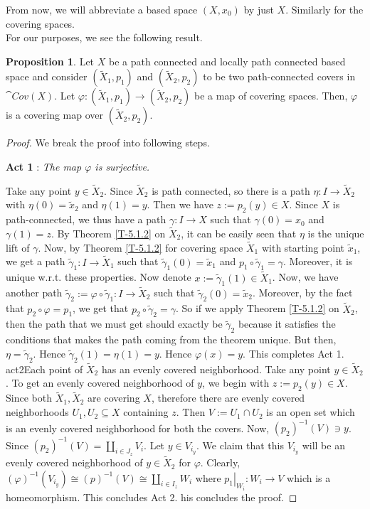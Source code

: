 \documentclass[letterpaper,11pt,twoside]{article}
\theoremstyle{definition}
\newtheorem{proposition}{Proposition}[subsection]
\theoremstyle{definition}
\theoremstyle{definition}
\theoremstyle{definition}
\theoremstyle{definition}
\theoremstyle{definition}
\theoremstyle{remark}
\theoremstyle{definition}
\newenvironment{act}[2]{\begin{center}
		\textbf{Act #1} : \textit{#2}
	\end{center}
}
\newcommand{\cat}[1]{{\fontfamily{lmss}\selectfont 
		\text{\textbf{#1}}
}}
\newcommand{\isom}{\cong}
\newcommand{\rest}[2]{\left. { #1 }\right \vert_{#2}}
\newcommand{\inv}[1]{\left(#1\right)^{-1}}
\newcommand{\Cov}[1]{\cat{Cov}\left (#1\right )}
\begin{document}
From now, we will abbreviate a based space $ (X,x_0) $ by just $ X $. Similarly for the covering spaces.\\

For our purposes, we see the following result.
\begin{proposition}\label{P-6.1.12}
	Let $ X $ be a path connected and locally path connected based space and consider $ (\tilde{X}_1,p_1) $ and $ (\tilde{X}_2,p_2) $ to be two path-connected covers in $ \Cov{X} $. Let $ \varphi: (\tilde{X}_1,p_1) \to (\tilde{X}_2,p_2) $ be a map of covering spaces. Then, $ \varphi $ is a covering map over $ (\tilde{X}_2,p_2) $. 
\end{proposition}
\begin{proof}We break the proof into following steps.
	\begin{act}{1}{The map $ \varphi $ is surjective.}
		Take any point $ y\in \tilde{X}_2 $. Since $ \tilde{X}_2 $ is path connected, so there is a path $ \eta : I \to \tilde{X}_2 $ with $ \eta(0) = \tilde{x}_2 $ and $ \eta(1) = y $. Then we have $ z:= p_2(y) \in X  $. Since $ X $ is path-connected, we thus have a path $ \gamma : I\to X $ such that $ \gamma(0) = x_0 $ and $ \gamma(1) = z $. By Theorem \ref{T-5.1.2} on $ \tilde{X}_2 $, it can be easily seen that $ \eta $ is the unique lift of $ \gamma $. Now, by Theorem \ref{T-5.1.2} for covering space $ \tilde{X}_1 $ with starting point $ \tilde{x}_1 $, we get a path $ \tilde{\gamma}_1 : I\to \tilde{X}_1 $ such that $ \tilde{\gamma}_1(0) = \tilde{x}_1 $ and $ p_1\circ \tilde{\gamma}_1 = \gamma $. Moreover, it is unique w.r.t. these properties. Now denote $ x:= \tilde{\gamma}_1(1) \in \tilde{X}_1$. Now, we have another path $\tilde{\gamma}_2 := \varphi\circ \tilde{\gamma}_1 : I\to \tilde{X}_2$ such that $ \tilde{\gamma}_2(0) = \tilde{x}_2 $. Moreover, by the fact that $ p_2\circ \varphi = p_1 $, we get that $ p_2\circ \tilde{\gamma}_2 = \gamma $. So if we apply Theorem \ref{T-5.1.2} on $ \tilde{X}_2 $, then the path that we must get should exactly be $ \tilde{\gamma}_2 $ because it satisfies the conditions that makes the path coming from the theorem unique. But then, $ \eta = \tilde{\gamma}_2 $. Hence $ \tilde{\gamma}_2(1) = \eta(1) = y $. Hence $ \varphi(x) = y $. This completes Act 1.
	\end{act}
	\begin{act}{2}{Each point of $ \tilde{X}_2 $ has an evenly covered neighborhood.}
		Take any point $ y\in \tilde{X}_2 $. To get an evenly covered neighborhood of $ y $, we begin with $ z:= p_2(y) \in X$. Since both $ \tilde{X}_1,\tilde{X}_2 $ are covering $ X $, therefore there are evenly covered neighborhoods $ U_1,U_2 \subseteq X $ containing $ z $. Then $ V:= U_1\cap U_2 $ is an open set which is an evenly covered neighborhood for both the covers. Now, $ \inv{p_2}(V) \ni y $. Since $ \inv{p_2}(V) = \coprod_{i\in J_z} V_i $. Let $ y\in V_{i_y} $. We claim that this $ V_{i_y} $ will be an evenly covered neighborhood of $ y\in \tilde{X}_2 $ for $ \varphi $. Clearly, $ \inv{\varphi}(V_{i_y}) \isom \inv{p}(V) \isom \coprod_{i\in I_z} W_i$ where $ \rest{p_1}{W_i} : W_i \to V $ which is a homeomorphism. This concludes Act 2.
	\end{act}
	This concludes the proof.
\end{proof}
\end{document}

